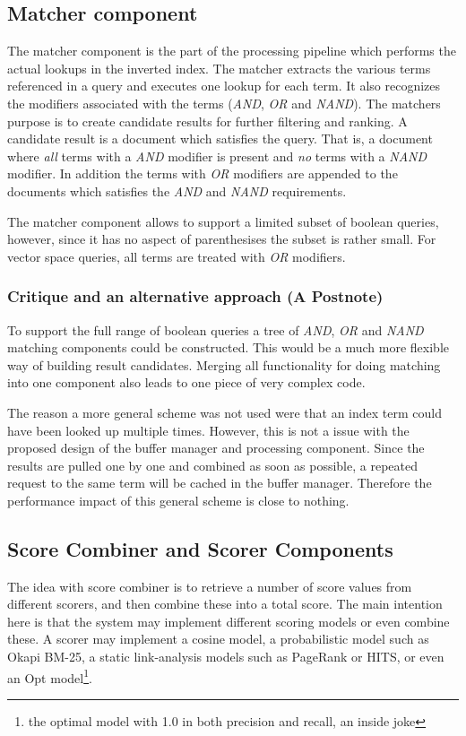 \subsection{Matcher component}
The matcher component is the part of the processing pipeline which performs the actual lookups in the inverted index. The matcher extracts the various terms referenced in a query and executes one lookup for each term. It also recognizes the modifiers associated with the terms (\emph{AND}, \emph{OR} and \emph{NAND}). The matchers purpose is to create candidate results for further filtering and ranking. A candidate result is a document which satisfies the query. That is, a document where \emph{all} terms with a \emph{AND} modifier is present and \emph{no} terms with a \emph{NAND} modifier. In addition the terms with \emph{OR} modifiers are appended to the documents which satisfies the \emph{AND} and \emph{NAND} requirements.

The matcher component allows to support a limited subset of boolean queries, however, since it has no aspect of parenthesises the subset is rather small. For vector space queries, all terms are treated with \emph{OR} modifiers.

\subsubsection{Critique and an alternative approach (A Postnote)}\label{sssub:matcher_critique}
To support the full range of boolean queries a tree of \emph{AND}, \emph{OR} and \emph{NAND} matching components could be constructed. This would be a much more flexible way of building result candidates. Merging all functionality for doing matching into one component also leads to one piece of very complex code.

The reason a more general scheme was not used were that an index term could have been looked up multiple times. However, this is not a issue with the proposed design of the buffer manager and processing component. Since the results are pulled one by one and combined as soon as possible, a repeated request to the same term will be cached in the buffer manager. Therefore the performance impact of this general scheme is close to nothing. 

\subsection{Score Combiner and Scorer Components}
The idea with score combiner is to retrieve a number of score values from different scorers, and then combine these into a total score. The main intention here is that the system may implement different scoring models or even combine these. A scorer may implement a cosine model, a probabilistic model such as Okapi BM-25, a static link-analysis models such as PageRank or HITS, or even an Opt model\footnote{the optimal model with 1.0 in both precision and recall, an inside joke}.


